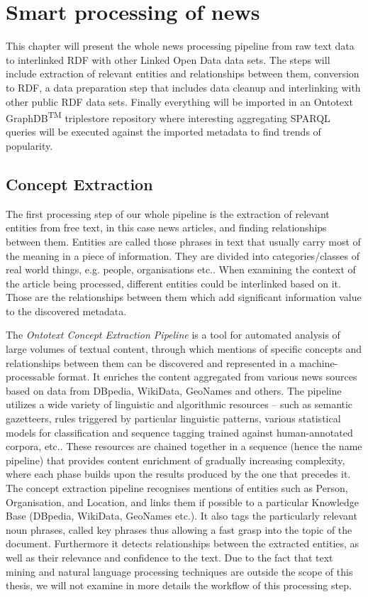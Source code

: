 \chapter{Smart processing of news}
\label{chap:news-pipeline}
This chapter will present the whole news processing pipeline from raw text data to interlinked RDF with other Linked Open Data data sets. The steps will include extraction of relevant entities and relationships between them, conversion to RDF, a data preparation step that includes data cleanup and interlinking with other public RDF data sets. Finally everything will be imported in an Ontotext GraphDB\textsuperscript{TM} triplestore repository where interesting aggregating SPARQL queries will be executed against the imported metadata to find trends of popularity.

\section{Concept Extraction}
The first processing step of our whole pipeline is the extraction of relevant entities from free text, in this case news articles, and finding relationships between them. Entities are called those phrases in text that usually carry most of the meaning in a piece of information. They are divided into categories/classes of real world things, e.g. people, organisations etc.. When examining the context of the article being processed, different entities could be interlinked based on it. Those are the relationships between them which add significant information value to the discovered metadata. 

The \textit{Ontotext Concept Extraction Pipeline} is a tool for automated analysis of large volumes of textual content, through which mentions of specific concepts and relationships between them can be discovered and represented in a machine-processable format. It enriches the content aggregated from various news sources based on data from DBpedia, WikiData, GeoNames and others. The pipeline utilizes a wide variety of linguistic and algorithmic resources – such as semantic gazetteers, rules triggered by particular linguistic patterns, various statistical models for classification and sequence tagging trained against human-annotated corpora, etc.. These resources are chained together in a sequence (hence the name pipeline) that provides content enrichment of gradually increasing complexity, where each phase builds upon the results produced by the one that precedes it. The concept extraction pipeline recognises mentions of entities such as Person, Organisation, and Location, and links them if possible to a particular Knowledge Base (DBpedia, WikiData, GeoNames etc.). It also tags the particularly relevant noun phrases, called key phrases thus allowing a fast grasp into the topic of the document. Furthermore it detects relationships between the extracted entities, as well as their relevance and confidence to the text. Due to the fact that text mining and natural language processing techniques are outside the scope of this thesis, we will not examine in more details the workflow of this processing step.

